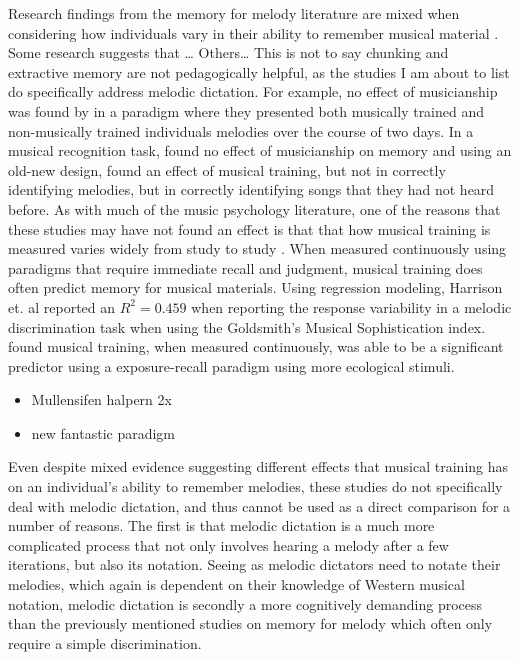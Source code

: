 \documentclass[]{book}
\providecommand{\tightlist}{%
  \setlength{\itemsep}{0pt}\setlength{\parskip}{0pt}}
\begin{document}
Research findings from the memory for melody literature are mixed when considering how individuals vary in their ability to remember musical material \citep{halpernMemoryMelodies2010}.
Some research suggests that \ldots{}
Others\ldots{}
This is not to say chunking and extractive memory are not pedagogically helpful, as the studies I am about to list do specifically address melodic dictation.
For example, no effect of musicianship was found by \citet{mcauleyPlayItAgain2004} in a paradigm where they presented both musically trained and non-musically trained individuals melodies over the course of two days.
In a musical recognition task, \citep{korenmanRoleFamiliarityEpisodic2004} found no effect of musicianship on memory and using an old-new design, \citep{munganLevelsofProcessingEffectsRemember2011} found an effect of musical training, but not in correctly identifying melodies, but in correctly identifying songs that they had not heard before.
As with much of the music psychology literature, one of the reasons that these studies may have not found an effect is that that how musical training is measured varies widely from study to study \citep{talaminiMusiciansHaveBetter2017}.
When measured continuously using paradigms that require immediate recall and judgment, musical training does often predict memory for musical materials.
Using regression modeling, Harrison et. al reported an \(R^2 = 0.459\) when reporting the response variability in a melodic discrimination task \citep{harrisonApplyingModernPsychometric2017a} when using the Goldsmith's Musical Sophistication index.
\citet{bakerPerceptionLeitmotivesRichard2017} found musical training, when measured continuously, was able to be a significant predictor using a exposure-recall paradigm using more ecological stimuli.

\citep{halpernEffectsTimbreTempo2008, mullensiefenRoleFeaturesContext2014, rainsfordMUSOSMUsicSOftware2018}

\begin{itemize}
\tightlist
\item
  Mullensifen halpern 2x
\item
  new fantastic paradigm
\end{itemize}

Even despite mixed evidence suggesting different effects that musical training has on an individual's ability to remember melodies, these studies do not specifically deal with melodic dictation, and thus cannot be used as a direct comparison for a number of reasons.
The first is that melodic dictation is a much more complicated process that not only involves hearing a melody after a few iterations, but also its notation.
Seeing as melodic dictators need to notate their melodies, which again is dependent on their knowledge of Western musical notation, melodic dictation is secondly a more cognitively demanding process than the previously mentioned studies on memory for melody which often only require a simple discrimination.
\end{document}
